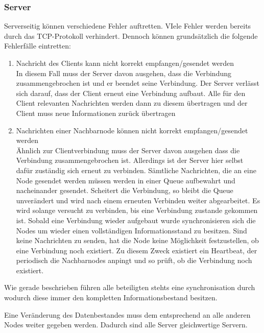 \subsubsection{Server}
Serverseitig können verschiedene Fehler auftretten. VIele Fehler werden bereits durch das TCP-Protokoll verhindert.
Dennoch können grundsätzlich die folgende Fehlerfälle eintretten:
\begin{enumerate}
    \item Nachricht des Clients kann nicht korrekt empfangen/gesendet werden\\
        In diesem Fall muss der Server davon ausgehen, dass die Verbindung zusammengebrochen ist und er beendet
        seine Verbindung. Der Server verlässt sich darauf, dass der Client erneut eine Verbindung aufbaut.
        Alle für den Client relevanten Nachrichten werden dann zu diesem übertragen und der Client muss
        neue Informationen zurück übertragen
    \item Nachrichten einer Nachbarnode können nicht korrekt empfangen/gesendet werden\\
        Ähnlich zur Clientverbindung muss der Server davon ausgehen dass die Verbindung zusammengebrochen ist.
        Allerdings ist der Server hier selbst dafür zuständig sich erneut zu verbinden. Sämtliche Nachrichten,
        die an eine Node gesendet werden müssen werden in einer Queue aufbewahrt und nacheinander gesendet.
        Scheitert die Verbindung, so bleibt die Queue unverändert und wird nach einem erneuten Verbinden
        weiter abgearbeitet. Es wird solange versucht zu verbinden, bis eine Verbindung zustande gekommen ist.
        Sobald eine Verbindung wieder aufgebaut wurde synchronisieren sich die Nodes um wieder einen vollständigen
        Informationsstand zu besitzen.
        Sind keine Nachrichten zu senden, hat die Node keine Möglichkeit festzustellen,
        ob eine Verbindung noch existiert. Zu diesem Zweck existiert ein Heartbeat, der periodisch
        die Nachbarnodes anpingt und so prüft, ob die Verbindung noch existiert.
\end{enumerate}
Wie gerade beschrieben führen alle beteiligten stehts eine synchronisation durch wodurch diese immer den kompletten Informationsbestand besitzen.

Eine Veränderung des Datenbestandes muss dem entsprechend an alle anderen Nodes weiter gegeben werden.
Dadurch sind alle Server gleichwertige Servern.




